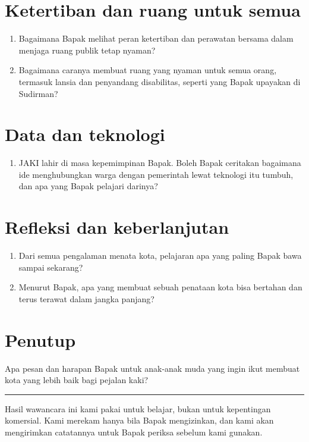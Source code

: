 \documentclass[11pt,a4paper]{article}
\begin{document}
\section*{Ketertiban dan ruang untuk semua}
\begin{enumerate}[start=6]
  \item Bagaimana Bapak melihat peran ketertiban dan perawatan bersama dalam menjaga ruang publik
        tetap nyaman?
  \item Bagaimana caranya membuat ruang yang nyaman untuk semua orang, termasuk lansia dan
        penyandang disabilitas, seperti yang Bapak upayakan di Sudirman?
\end{enumerate}

\section*{Data dan teknologi}
\begin{enumerate}[start=8]
  \item JAKI lahir di masa kepemimpinan Bapak. Boleh Bapak ceritakan bagaimana ide menghubungkan
        warga dengan pemerintah lewat teknologi itu tumbuh, dan apa yang Bapak pelajari darinya?
\end{enumerate}

\section*{Refleksi dan keberlanjutan}
\begin{enumerate}[start=9]
  \item Dari semua pengalaman menata kota, pelajaran apa yang paling Bapak bawa sampai sekarang?
  \item Menurut Bapak, apa yang membuat sebuah penataan kota bisa bertahan dan terus terawat dalam
        jangka panjang?
\end{enumerate}

\section*{Penutup}
Apa pesan dan harapan Bapak untuk anak-anak muda yang ingin ikut membuat kota yang lebih baik bagi
pejalan kaki?

\vspace{8pt}
\noindent\rule{\textwidth}{0.3pt}

\vspace{2pt}
{\small Hasil wawancara ini kami pakai untuk belajar, bukan untuk kepentingan komersial. Kami
merekam hanya bila Bapak mengizinkan, dan kami akan mengirimkan catatannya untuk Bapak periksa
sebelum kami gunakan.}
\end{document}
